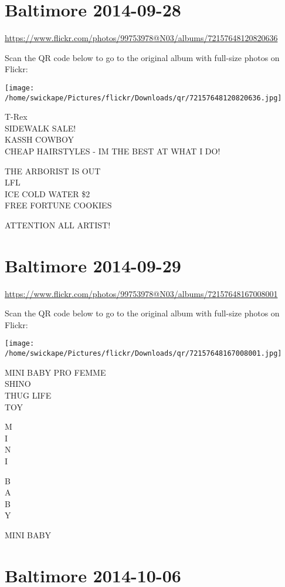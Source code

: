 \documentclass[10pt,letterpaper]{article}
\begin{document}
\section*{Baltimore 2014-09-28}

\url{https://www.flickr.com/photos/99753978@N03/albums/72157648120820636}

Scan the QR code below to go to the original album with full-size photos on Flickr:

\texttt{[image: /home/swickape/Pictures/flickr/Downloads/qr/72157648120820636.jpg]}


T{-}Rex\\
SIDEWALK SALE!\\
KASSH COWBOY\\
CHEAP HAIRSTYLES {-} IM THE BEST AT WHAT I DO!

THE ARBORIST IS OUT\\
LFL\\
ICE COLD WATER \$2\\
FREE FORTUNE COOKIES

ATTENTION ALL ARTIST!


\section*{Baltimore 2014-09-29}

\url{https://www.flickr.com/photos/99753978@N03/albums/72157648167008001}

Scan the QR code below to go to the original album with full-size photos on Flickr:

\texttt{[image: /home/swickape/Pictures/flickr/Downloads/qr/72157648167008001.jpg]}


MINI BABY PRO FEMME\\
SHINO\\
THUG LIFE\\
TOY

M\\
I\\
N\\
I

B\\
A\\
B\\
Y

MINI BABY


\section*{Baltimore 2014-10-06}
\end{document}
